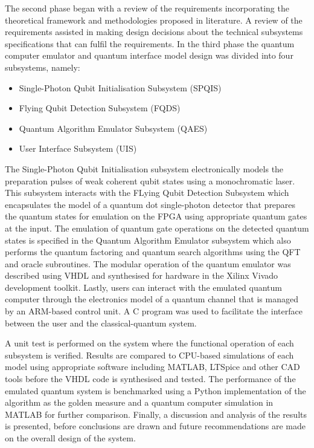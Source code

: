 The second phase began with a review of the requirements incorporating the theoretical framework and methodologies proposed in literature. A review of the requirements assisted in making design decisions about the technical subsystems specifications that can fulfil the requirements. In the third phase the quantum computer emulator and quantum interface model design was divided into four subsystems, namely:
\begin{itemize}
	\item 
	Single-Photon Qubit Initialisation Subsystem (SPQIS)
	\item
	Flying Qubit Detection Subsystem (FQDS)
	\item 
	Quantum Algorithm Emulator Subsystem (QAES)
	\item 
	User Interface Subsystem (UIS)
\end{itemize}
The Single-Photon Qubit Initialisation subsystem electronically models the preparation pulses of weak coherent qubit states using a monochromatic laser. This subsystem interacts with the FLying Qubit Detection Subsystem which encapsulates the model of a quantum dot single-photon detector that prepares the quantum states for emulation on the FPGA using appropriate quantum gates at the input. The emulation of quantum gate operations on the detected quantum states is specified in the Quantum Algorithm Emulator subsystem which also performs the quantum factoring and quantum search algorithms using the QFT and oracle subroutines. The modular operation of the quantum emulator was described using VHDL and synthesised for hardware in the Xilinx Vivado development toolkit. Lastly, users can interact with the emulated quantum computer through the electronics model of a quantum channel that is managed by an ARM-based control unit. A C program was used to facilitate the interface between the user and the classical-quantum system.  

A unit test is performed on the system where the functional operation of each subsystem is verified. Results are compared to CPU-based simulations of each model using appropriate software including MATLAB, LTSpice and other CAD tools before the VHDL code is synthesised and tested. The performance of the emulated quantum system is benchmarked using a Python implementation of the algorithm as the golden measure and a quantum computer simulation in MATLAB for further comparison. Finally, a discussion and analysis of the results is presented, before conclusions are drawn and future recommendations are made on the overall design of the system. 

